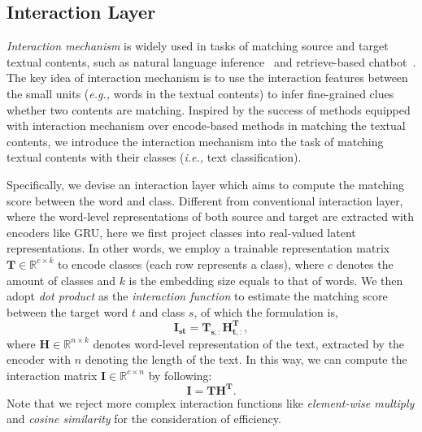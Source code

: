 \documentclass[letterpaper]{article} \usepackage{aaai19}  \usepackage{times}  \usepackage{helvet}  \usepackage{courier}  \usepackage{url}  \usepackage{graphicx}
\newcommand{\ie}{\emph{i.e., }}
\newcommand{\eg}{\emph{e.g., }}
\begin{document}
\subsection{Interaction Layer}
\textit{Interaction mechanism} is widely used in tasks of matching source and target textual contents, such as natural language inference~\cite{llstm} and retrieve-based chatbot~\cite{smn}. The key idea of interaction mechanism is to use the interaction features between the small units (\eg words in the textual contents) to infer fine-grained clues whether two contents are matching. Inspired by the success of methods equipped with interaction mechanism over encode-based methods in matching the textual contents, we introduce the interaction mechanism into the task of matching textual contents with their classes (\ie text classification). 

Specifically, we devise an interaction layer which aims to compute the matching score between the word and class. Different from conventional interaction layer, where the word-level representations of both source and target are extracted with encoders like GRU, here we first project classes into real-valued latent representations. In other words, we employ a trainable representation matrix $\mathbf{T} \in \mathbb{R}^{c\times k}$ to encode classes (each row represents a class), where $c$ denotes the amount of classes and $k$ is the embedding size equals to that of words. 
We then adopt \textit{dot product} as the \textit{interaction function} to estimate the matching score between the target word $t$ and class $s$, of which the formulation is,
\begin{equation}
\mathbf{I_{st}} =\mathbf{T_{s,:}} \mathbf{H_{t,:}^{T}},
\end{equation}
where $\mathbf{H} \in \mathbb{R}^{n \times k}$ denotes word-level representation of the text, extracted by the encoder with $n$ denoting the length of the text. 
In this way, we can compute the interaction matrix $\mathbf{I} \in \mathbb{R}^{c\times n}$ by following:
\begin{equation}
\mathbf{I} =\mathbf{T} \mathbf{H^{T}}.
\end{equation}
Note that we reject more complex interaction functions like \textit{element-wise multiply} \cite{diin} and \textit{cosine similarity} \cite{BIMPM} for the consideration of efficiency.
\end{document}
